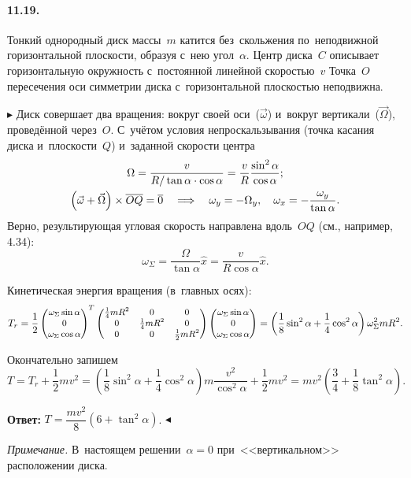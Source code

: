\documentclass{weekly}
\begin{document}

\paragraph{11.19.} Тонкий однородный диск массы~$m$ катится
без~скольжения по~неподвижной горизонтальной плоскости,
образуя с~нею угол~$\alpha$. Центр диска~$C$ описывает
горизонтальную окружность с~постоянной линейной скоростью~$v$
Точка~$O$ пересечения оси симметрии диска с~горизонтальной
плоскостью неподвижна.

$\blacktriangleright$ Диск совершает два вращения:
вокруг своей оси~($\vec\omega$) и~вокруг вертикали~($\vec\Omega$),
проведённой через~$O$.
С~учётом условия непроскальзывания (точка касания диска
и~плоскости~$Q$) и~заданной скорости центра
\begin{gather}
    \Omega = \frac{v}{R/\tan\alpha \cdot \cos\alpha}
        = \frac{v}{R} \frac{\sin^2\alpha}{\cos\alpha}; \\
    \left(\vec\omega + \vec\Omega\right) \times \overline{OQ}
        = \overline{0}
    \quad \Longrightarrow \quad \omega_y = -\Omega_y,\quad
        \omega_x = -\frac{\omega_y}{\tan\alpha}.
\end{gather}
Верно, результирующая угловая скорость направлена
вдоль~$OQ$ (см., например, 4.34):
\begin{equation}
    \omega_\Sigma = \frac{\Omega}{\tan\alpha} \hat x
        = \frac{v}{R\cos\alpha} \hat x.
\end{equation}

Кинетическая энергия вращения (в~главных осях):
\begin{equation}
    T_r = \frac{1}{2}
        \small\begin{pmatrix}\omega_\Sigma\sin\alpha\\0\\\omega_\Sigma\cos\alpha\end{pmatrix}^T
        \begin{pmatrix}
            \frac{1}{4} mR^2 & 0 & 0 \\
            0 & \frac{1}{4} mR^2 & 0 \\
            0 & 0 & \frac{1}{2} mR^2
        \end{pmatrix}
        \small\begin{pmatrix}\omega_\Sigma\sin\alpha\\0\\\omega_\Sigma\cos\alpha\end{pmatrix}
        = \left(\frac{1}{8} \sin^2\alpha 
        + \frac{1}{4} \cos^2\alpha\right) \omega_\Sigma^2 mR^2.
\end{equation}

Окончательно запишем
\begin{equation}
    T = T_r + \frac{1}{2} mv^2
        = \left(\frac{1}{8} \sin^2\alpha +
            \frac{1}{4} \cos^2\alpha\right)
            m \frac{v^2}{\cos^2\alpha} + \frac{1}{2} mv^2
        = mv^2 \left(\frac{3}{4} + \frac{1}{8}\tan^2\alpha\right).
\end{equation}

\textbf{Ответ:} \qquad
$T = \dfrac{mv^2}{8} \left(6 + \tan^2\alpha\right)$.
\hfill $\blacktriangleleft$

\textsl{Примечание.} В~настоящем решении~$\alpha = 0$
при~<<вертикальном>> расположении диска.
\end{document}
